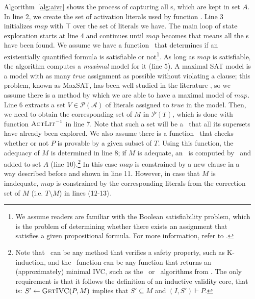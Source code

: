 Algorithm~\ref{alg:aivc} shows the process of capturing all \mivc s, which are kept in set $A$.
In line 2, we create the set of activation literals used by function \actlit . Line 3 initializes $map$ with $\top$ over the set of literals we have. The main loop of state exploration starts at line 4 and continues until $map$ becomes \unsat that means all the \mivc s have been found. We assume we have a function \checksat ~that determines if an existentially quantified formula  is satisfiable or not\footnote{We assume readers are familiar with the Boolean satisfiability problem, which is the problem of determining whether there exists an assignment that satisfies a given propositional formula. For more information, refer to \cite{cook1971complexity}.}.
As long as $map$ is satisfiable, the algorithm computes a \emph{maximal} \sat model for it (line 5). A maximal SAT model is a model with as many $true$ assignment as possible without violating a clause; this problem, known as MaxSAT, has been well studied in the literature \cite{cimatti2013modular, davies2011solving, morgado2013iterative}, so we assume there is a method by which we are able to have a maximal model of $map$.
Line 6 extracts a set $V \in \mathcal{P} (\mathcal{A})$ of literals assigned to $true$ in the model.
Then, we need to obtain the corresponding set of $M$ in $\mathcal{P}(T)$, which is done with function $\textsc{ActLit} ^{-1}$ in line 7. 
Note that such a set will be a \mis\ that all its supersets have already been explored. We also assume there is a function \isadeq ~that checks whether or not $P$ is provable by a given subset of $T$. Using this function, the adequacy of $M$ is determined in line 8; if $M$ is adequate,
an \mivc  ~is computed by \getivc ~and added to set $A$ (line 10).\footnote{Note that \isadeq ~can be any method that verifies a safety property, such as K-induction, and the \getivc\ function can be any function that returns an (approximately) minimal IVC, such as the \ucalg\ or \ucbfalg\ algorithms from \cite{Ghass16}.  The only requirement is that it follows the definition of an inductive validity core, that is: $S' \leftarrow \textsc{GetIVC} (P, M)$ implies that $S' \subseteq M$ and $(I, S') \vdash P$.} In this case $map$ is constrained by a new clause in a way described before and shown in line 11. However, in case that $M$ is inadequate, $map$ is constrained by the corresponding literals from the correction set of $M$ (i.e. $T \setminus M$) in lines (12-13).

